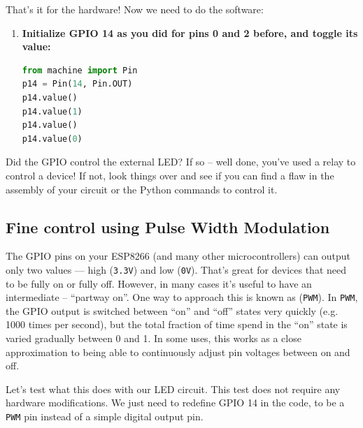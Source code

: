 That’s it for the hardware! Now we need to do the software:

\begin{enumerate}[resume]
	\item \textbf{Initialize GPIO 14 as you did for pins 0 and 2 before, and toggle its value:}
\begin{lstlisting}[language=Python]
from machine import Pin
p14 = Pin(14, Pin.OUT)
p14.value()
p14.value(1)
p14.value()
p14.value(0)
\end{lstlisting}
\end{enumerate}
Did the GPIO control the external LED? If so – well done, you’ve used a relay to control a device! 
If not, look things over and see if you can find a flaw in the assembly of your circuit or the Python commands to control it.

\subsection{Fine control using Pulse Width Modulation}
The GPIO pins on your ESP8266 (and many other microcontrollers) can output only two values --- high (\texttt{3.3V}) and low (\texttt{0V}). 
That's great for devices that need to be fully on or fully off. 
However, in many cases it’s useful to have an intermediate -- ``partway on''. 
One way to approach this is known as  (\texttt{PWM}). 
In \texttt{PWM}, the GPIO output is switched between ``on'' and ``off'' states very quickly (e.g. 1000 times per second), but the total fraction of time spend in the ``on'' state is varied gradually between 0 and 1. 
In some uses, this works as a close approximation to being able to continuously adjust pin voltages between on and off.

Let’s test what this does with our LED circuit. 
This test does not require any hardware modifications. 
We just need to redefine GPIO 14 in the code, to be a \texttt{PWM} pin instead of a simple digital output pin.

